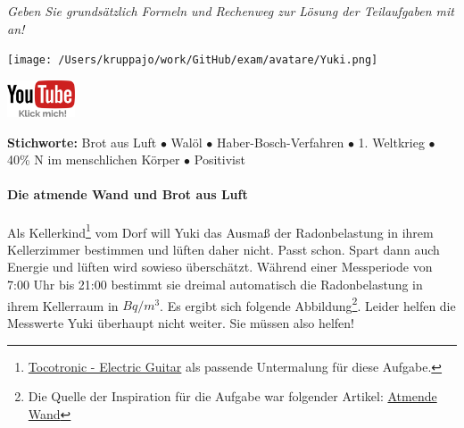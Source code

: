 \documentclass[a4paper, 9pt]{scrartcl}\usepackage[]{graphicx}\usepackage[]{xcolor}
\begin{document}
\textit{Geben Sie grundsätzlich Formeln und Rechenweg zur Lösung der Teilaufgaben mit an!} \\[1Ex]
 

 
\ifcollection
\begin{flushright}
\tiny\vspace{-3Ex}
\textbf{\examinhaltstart}
\exammodulemathstat
\vspace{-4Ex}
\end{flushright}
\begin{minipage}[t]{0.5\textwidth}
\texttt{[image: /Users/kruppajo/work/GitHub/exam/avatare/Yuki.png]}
\end{minipage}
\begin{minipage}[t]{0.5\textwidth}
\hfill
\href{https://youtu.be/4-dSaPMhK9s}{\includegraphics[width = 2cm]{img/youtube}}
\end{minipage}
\fi

{\tiny\textbf{Stichworte:} Brot aus Luft $\bullet$ Walöl $\bullet$ Haber-Bosch-Verfahren $\bullet$ 1. Weltkrieg $\bullet$ 40\% N im menschlichen Körper $\bullet$ Positivist}



\ifcollection
\paragraph{Die atmende Wand und Brot aus Luft}
\fi



Als Kellerkind\footnote{\href{https://www.youtube.com/watch?v=54H0HAJexVI}{Tocotronic - Electric Guitar} als passende Untermalung für diese Aufgabe.} vom Dorf will Yuki das Ausmaß der Radonbelastung in ihrem Kellerzimmer bestimmen und lüften daher nicht. Passt schon. Spart dann auch Energie und lüften wird sowieso überschätzt. Während einer Messperiode von 7:00 Uhr bis 21:00 bestimmt sie dreimal automatisch die Radonbelastung in ihrem Kellerraum in $Bq/m^3$. Es ergibt sich folgende Abbildung\footnote{Die Quelle der Inspiration für die Aufgabe war folgender Artikel: \href{https://de.wikipedia.org/wiki/Atmende_Wand}{Atmende Wand}}. Leider helfen die Messwerte Yuki überhaupt nicht weiter. Sie müssen also helfen! 
\end{document}
